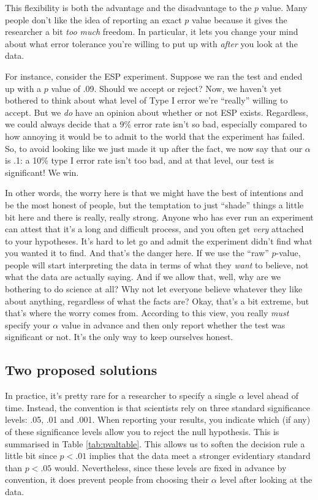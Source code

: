 \documentclass[
]{book}
\theoremstyle{definition}
\theoremstyle{definition}
\theoremstyle{definition}
\theoremstyle{definition}
\theoremstyle{remark}
\begin{document}
This flexibility is both the advantage and the disadvantage to the \(p\) value. Many people don't like the idea of reporting an exact \(p\) value because it gives the researcher a bit \emph{too much} freedom. In particular, it lets you change your mind about what error tolerance you're willing to put up with \emph{after} you look at the data.

For instance, consider the ESP experiment. Suppose we ran the test and ended up with a \(p\) value of .09. Should we accept or reject? Now, we haven't yet bothered to think about what level of Type I error we're ``really'' willing to accept. But we \emph{do} have an opinion about whether or not ESP exists. Regardless, we could always decide that a 9\% error rate isn't so bad, especially compared to how annoying it would be to admit to the world that the experiment has failed. So, to avoid looking like we just made it up after the fact, we now say that our \(\alpha\) is .1: a 10\% type I error rate isn't too bad, and at that level, our test is significant! We win.

In other words, the worry here is that we might have the best of intentions and be the most honest of people, but the temptation to just ``shade'' things a little bit here and there is really, really strong. Anyone who has ever run an experiment can attest that it's a long and difficult process, and you often get \emph{very} attached to your hypotheses. It's hard to let go and admit the experiment didn't find what you wanted it to find. And that's the danger here. If we use the ``raw'' \(p\)-value, people will start interpreting the data in terms of what they \emph{want} to believe, not what the data are actually saying. And if we allow that, well, why are we bothering to do science at all? Why not let everyone believe whatever they like about anything, regardless of what the facts are? Okay, that's a bit extreme, but that's where the worry comes from. According to this view, you really \emph{must} specify your \(\alpha\) value in advance and then only report whether the test was significant or not. It's the only way to keep ourselves honest.

\hypertarget{two-proposed-solutions}{%
\subsection{Two proposed solutions}\label{two-proposed-solutions}}

In practice, it's pretty rare for a researcher to specify a single \(\alpha\) level ahead of time. Instead, the convention is that scientists rely on three standard significance levels: .05, .01 and .001. When reporting your results, you indicate which (if any) of these significance levels allow you to reject the null hypothesis. This is summarised in Table \ref{tab:pvaltable}. This allows us to soften the decision rule a little bit since \(p<.01\) implies that the data meet a stronger evidentiary standard than \(p<.05\) would. Nevertheless, since these levels are fixed in advance by convention, it does prevent people from choosing their \(\alpha\) level after looking at the data.
\end{document}
